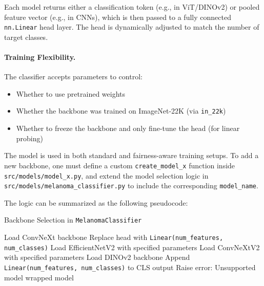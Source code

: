 Each model returns either a classification token (e.g., in ViT/DINOv2) or pooled feature vector (e.g., in CNNs), which is then passed to a fully connected \texttt{nn.Linear} head layer. The head is dynamically adjusted to match the number of target classes.


\paragraph{Training Flexibility.}
The classifier accepts parameters to control:
\begin{itemize}
    \item Whether to use pretrained weights
    \item Whether the backbone was trained on ImageNet-22K (via \texttt{in\_22k})
    \item Whether to freeze the backbone and only fine-tune the head (for linear probing)
\end{itemize}

The model is used in both standard and fairness-aware training setups. To add a new backbone, one must define a custom \texttt{create\_model\_x} function inside \texttt{src/models/model\_x.py}, and extend the model selection logic in \texttt{src/models/melanoma\_classifier.py} to include the corresponding \texttt{model\_name}.

\noindent The logic can be summarized as the following pseudocode:

\begin{algorithm}[H]
\caption{Backbone Selection in \texttt{MelanomaClassifier}}
\begin{algorithmic}[1]
        \State Load ConvNeXt backbone
        \State Replace head with \texttt{Linear(num\_features, num\_classes)}
        \State Load EfficientNetV2 with specified parameters
        \State Load ConvNeXtV2 with specified parameters
        \State Load DINOv2 backbone
        \State Append \texttt{Linear(num\_features, num\_classes)} to CLS output
    \Else
        \State Raise error: Unsupported model
    \EndIf
    \State \Return wrapped model
\EndFunction
\end{algorithmic}
\end{algorithm}



